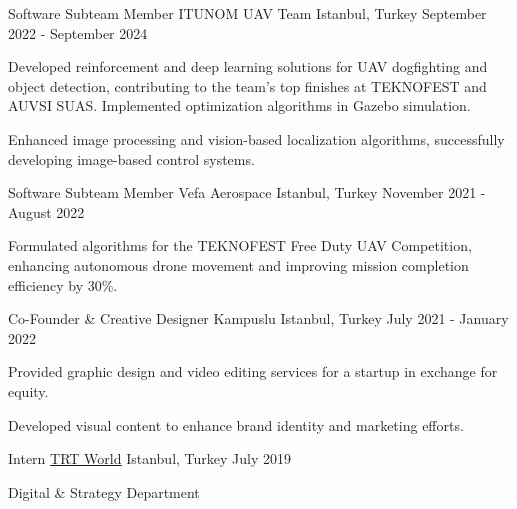 \begin{cventries}
\cventry
    {Software Subteam Member} %
    {ITUNOM UAV Team} %
    {Istanbul, Turkey} %
    {September 2022 - September 2024} %
    {
      \begin{cvitems} %
        \item {Developed reinforcement and deep learning solutions for UAV dogfighting and object detection, contributing to the team's top finishes at TEKNOFEST and AUVSI SUAS. Implemented optimization algorithms in Gazebo simulation.}
        \item {Enhanced image processing and vision-based localization algorithms, successfully developing image-based control systems.}
      \end{cvitems}
    }


  \cventry
    {Software Subteam Member} %
    {Vefa Aerospace} %
    {Istanbul, Turkey} %
    {November 2021 - August 2022} %
    {
      \begin{cvitems} %
        \item {Formulated algorithms for the TEKNOFEST Free Duty UAV Competition, enhancing autonomous drone movement and improving mission completion efficiency by 30\%.}
      \end{cvitems}
    }

  \cventry
    {Co-Founder \& Creative Designer} %
    {Kampuslu} %
    {Istanbul, Turkey} %
    {July 2021 - January 2022} %
    {
      \begin{cvitems} %
        \item {Provided graphic design and video editing services for a startup in exchange for equity.}
        \item {Developed visual content to enhance brand identity and marketing efforts.}
      \end{cvitems}
    }


  \cventry
    {Intern} %
    {\href{https://www.trtworld.com/}{\underline{TRT World}}} %
    {Istanbul, Turkey} %
    {July 2019} %
    {
      \begin{cvitems} %
        \item {Digital \& Strategy Department}
      \end{cvitems}
    }



\end{cventries}
